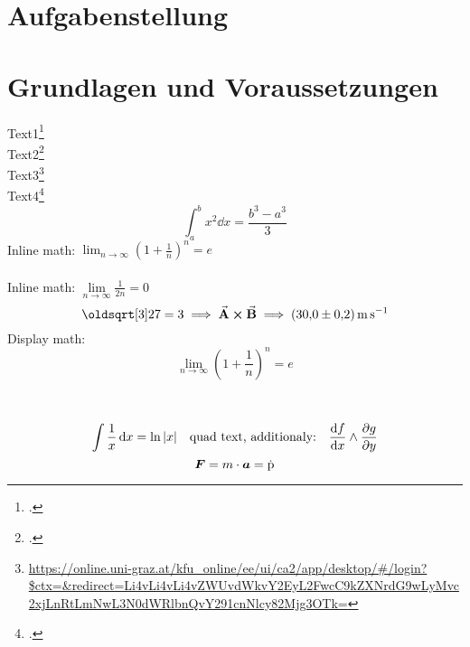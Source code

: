 \documentclass[ngerman]{scrartcl}
\begin{document}


\clearpage
\tableofcontents
\newpage

\section{Aufgabenstellung}
\label{sec:aufgabenstellung}



\section{Grundlagen und Voraussetzungen}
\label{sec:grundlagen_voraussetzungen}

Text1\footcite[1000]{ref:dem1} \\
Text2\footcite[Kapitel 74]{ref:knoll} \\
Text3\footnote{\url{https://online.uni-graz.at/kfu_online/ee/ui/ca2/app/desktop/\#/login?$ctx=&redirect=Li4vLi4vLi4vZWUvdWkvY2EyL2FwcC9kZXNrdG9wLyMvc2xjLnRtLmNwL3N0dWRlbnQvY291cnNlcy82Mjg3OTk=}} \\  %
Text4\footcite{ref:genol2013}
%
\begin{equation}
    \label{eq:grenzen-oben-unten}
    \int_a^b x^2 \dd{x} =\frac{b^3-a^3}{3}  %
\end{equation}
%
Inline math: \(\lim_{n \to \infty} \left( 1 + \frac{1}{n} \right) ^{n} = e\)  \\ \\ %
Inline math: $\lim \limits_{n \to \infty} \frac{1}{2n} = 0$  %
%
\begin{displaymath}
    \sqrt[3]{27} = 3 \implies \va{A} \cross \va{B} \implies \SI{30.0(2)}{\meter\per\second}
\end{displaymath}
%
Display math: \[\lim_{n \to \infty} \left( 1 + \frac{1}{n} \right) ^{n} = e\]  \\ \\ %
\[ \int \frac{1}{x} \dd{x} = \ln|x| \qq{quad text, additionaly:} \dv{f}{x} \land \pdv{g}{y}\]  %
$$ \vb*{F} = m \cdot \vb*{a} = \dot{\text{\textup{p}}}$$  %
\end{document}
